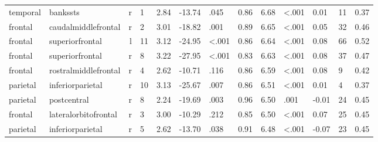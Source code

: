 \documentclass{article}
\begin{document}
\begin{longtable}{llrR{1.3cm}R{1cm}R{1.3cm}R{1cm}R{1cm}R{1.3cm}R{1cm}R{1.8cm}R{1.3cm}R{1.8cm}}
  temporal &                  bankssts &    r &         1 &                  2.84 &           -13.74 &               .045 &                               0.86 &                          6.68 &                   \textless.001 &   0.01 &     11 &      0.37 \\
   frontal &       caudalmiddlefrontal &    r &         2 &                  3.01 &           -18.82 &               .001 &                               0.89 &                          6.65 &                   \textless.001 &   0.05 &     32 &      0.46 \\
   frontal &           superiorfrontal &    l &        11 &                  3.12 &           -24.95 &      \textless.001 &                               0.86 &                          6.64 &                   \textless.001 &   0.08 &     66 &      0.52 \\
   frontal &           superiorfrontal &    r &         8 &                  3.22 &           -27.95 &      \textless.001 &                               0.83 &                          6.63 &                   \textless.001 &   0.08 &     37 &      0.47 \\
   frontal &      rostralmiddlefrontal &    r &         4 &                  2.62 &           -10.71 &               .116 &                               0.86 &                          6.59 &                   \textless.001 &   0.08 &      9 &      0.42 \\
  parietal &          inferiorparietal &    r &        10 &                  3.13 &           -25.67 &               .007 &                               0.86 &                          6.51 &                   \textless.001 &   0.01 &      4 &      0.37 \\
  parietal &               postcentral &    r &         8 &                  2.24 &           -19.69 &               .003 &                               0.96 &                          6.50 &                            .001 &  -0.01 &     24 &      0.45 \\
   frontal &      lateralorbitofrontal &    r &         3 &                  3.00 &           -10.29 &               .212 &                               0.85 &                          6.50 &                   \textless.001 &   0.07 &     25 &      0.45 \\
  parietal &          inferiorparietal &    r &         5 &                  2.62 &           -13.70 &               .038 &                               0.91 &                          6.48 &                   \textless.001 &  -0.07 &     23 &      0.45 \\

\end{longtable}
\end{document}
